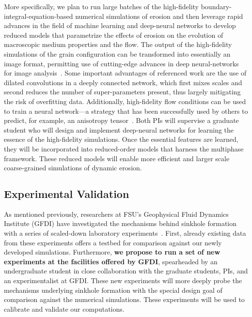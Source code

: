 \documentclass[11pt]{article}
\begin{document}
More specifically, we plan to run large batches of the high-fidelity boundary-integral-equation-based numerical simulations of erosion and then leverage rapid advances in the field of machine learning and deep-neural networks \cite{ling2016reynolds, kutz2017deep, ling2016machine, pelt2018mixed} to develop reduced models that parametrize the effects of erosion on the evolution of macroscopic medium properties and the flow.  The output of the high-fidelity simulations of the grain configuration can be transformed into essentially an image format, permitting use of cutting-edge advances in deep neural-networks for image analysis~\cite{pelt2018mixed}. Some important advantages of referenced work are the use of dilated convolutions in a deeply connected network, which first mixes scales and second reduces the number of super-parameters present, thus largely mitigating the risk of overfitting data. Additionally, high-fidelity flow conditions can be used to train a neural network---a strategy that has been successfully used by others to predict, for example, an anisotropy tensor~\cite{ling2016reynolds}.  Both PIs will supervise a graduate student who will design and implement deep-neural networks for learning the essence of the high-fidelity simulations. Once the essential features are learned, they will be incorporated into reduced-order models that harness the multiphase framework. These reduced models will enable more efficient and larger scale coarse-grained simulations of dynamic erosion.

\subsection{Experimental Validation}
\label{sec:experiments}
As mentioned previously, researchers at FSU's Geophysical Fluid Dynamics
Institute (GFDI) have investigated the mechanisms behind sinkhole
formation with a series of scaled-down laboratory
experiments~\cite{tao2014experimental}. First, already existing data
from these experiments offers a testbed for comparison against our newly
developed simulations. Furthermore, {\bf we propose to run a set of new
experiments at the facilities offered by GFDI}, spearheaded by an undergraduate student in close collaboration with the graduate students, PIs, and an experimentalist at GFDI. These new experiments will more deeply probe the mechanisms underlying sinkhole formation with the special design goal of comparison against the numerical simulations. These experiments will be used to calibrate and validate our computations.
\end{document}
